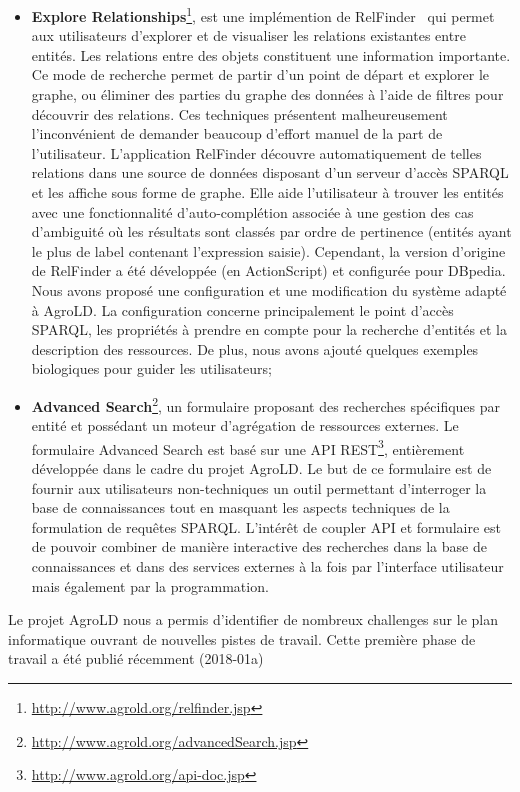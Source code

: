 \begin{itemize}
\item \textbf{Explore Relationships}\footnote{\url{http://www.agrold.org/relfinder.jsp}}, est une implémention de RelFinder~\cite{relfinder} qui permet aux utilisateurs d’explorer et de visualiser les relations existantes entre entités. Les relations entre des objets constituent une information importante. Ce mode de recherche permet de partir d’un point de départ et explorer le graphe, ou éliminer des parties du graphe des données à l’aide de filtres pour découvrir des relations. Ces techniques présentent malheureusement l’inconvénient de demander beaucoup d’effort manuel de la part de l’utilisateur. L’application RelFinder découvre automatiquement de telles relations dans une source de données disposant d’un serveur d’accès SPARQL et les affiche sous forme de graphe. Elle aide l’utilisateur à trouver les entités avec une fonctionnalité d’auto-complétion associée à une gestion des cas d’ambiguité où les résultats sont classés par ordre de pertinence (entités ayant le plus de label contenant l’expression saisie). Cependant, la version d'origine de RelFinder a été développée (en ActionScript) et configurée pour DBpedia. Nous avons proposé une configuration et une modification du système adapté à AgroLD. La configuration concerne principalement le point d’accès SPARQL, les propriétés à prendre en compte pour la recherche d’entités et la description des ressources. De plus, nous avons ajouté quelques exemples biologiques pour guider les utilisateurs;\\
\item \textbf{Advanced Search}\footnote{\url{http://www.agrold.org/advancedSearch.jsp}}, un formulaire proposant des recherches spécifiques par entité et possédant un moteur d'agrégation de ressources externes. Le formulaire Advanced Search est basé sur une API REST\footnote{\url{http://www.agrold.org/api-doc.jsp}}, entièrement développée dans le cadre du projet AgroLD. Le but de ce formulaire est de fournir aux utilisateurs non-techniques un outil permettant d’interroger la base de connaissances tout en masquant les aspects techniques de la formulation de requêtes SPARQL. L'intérêt de coupler API et formulaire est de pouvoir combiner de manière interactive des recherches dans la base de connaissances et dans des services externes à la fois par l'interface utilisateur mais également par la programmation.\\

\end{itemize}

Le projet AgroLD nous a permis d’identifier de nombreux challenges sur le plan informatique ouvrant de nouvelles pistes de travail. Cette première phase de travail a été publié récemment (2018-01a)\\

